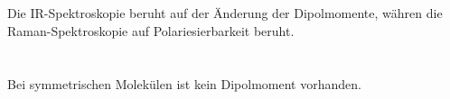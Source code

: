 \section{}
Die IR-Spektroskopie beruht auf der Änderung der Dipolmomente, währen die Raman-Spektroskopie auf Polariesierbarkeit beruht.
\section{}
Bei symmetrischen Molekülen ist kein Dipolmoment vorhanden.
\section{}
